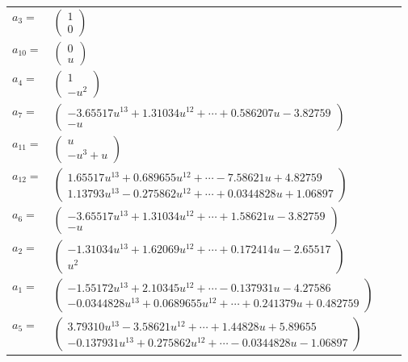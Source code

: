 \documentclass[1p]{elsarticle_modified}
\theoremstyle{definition}
\begin{document}
\begin{tabular}{m{7pt} m{180pt} m{7pt} m{180pt} }
\flushright $a_{3}=$&$\begin{pmatrix}1\\0\end{pmatrix}$ \\
\flushright $a_{10}=$&$\begin{pmatrix}0\\u\end{pmatrix}$ \\
\flushright $a_{4}=$&$\begin{pmatrix}1\\- u^2\end{pmatrix}$ \\
\flushright $a_{7}=$&$\begin{pmatrix}-3.65517 u^{13}+1.31034 u^{12}+\cdots+0.586207 u-3.82759\\- u\end{pmatrix}$ \\
\flushright $a_{11}=$&$\begin{pmatrix}u\\- u^3+u\end{pmatrix}$ \\
\flushright $a_{12}=$&$\begin{pmatrix}1.65517 u^{13}+0.689655 u^{12}+\cdots-7.58621 u+4.82759\\1.13793 u^{13}-0.275862 u^{12}+\cdots+0.0344828 u+1.06897\end{pmatrix}$ \\
\flushright $a_{6}=$&$\begin{pmatrix}-3.65517 u^{13}+1.31034 u^{12}+\cdots+1.58621 u-3.82759\\- u\end{pmatrix}$ \\
\flushright $a_{2}=$&$\begin{pmatrix}-1.31034 u^{13}+1.62069 u^{12}+\cdots+0.172414 u-2.65517\\u^2\end{pmatrix}$ \\
\flushright $a_{1}=$&$\begin{pmatrix}-1.55172 u^{13}+2.10345 u^{12}+\cdots-0.137931 u-4.27586\\-0.0344828 u^{13}+0.0689655 u^{12}+\cdots+0.241379 u+0.482759\end{pmatrix}$ \\
\flushright $a_{5}=$&$\begin{pmatrix}3.79310 u^{13}-3.58621 u^{12}+\cdots+1.44828 u+5.89655\\-0.137931 u^{13}+0.275862 u^{12}+\cdots-0.0344828 u-1.06897\end{pmatrix}$ \\

\end{tabular}
\end{document}
